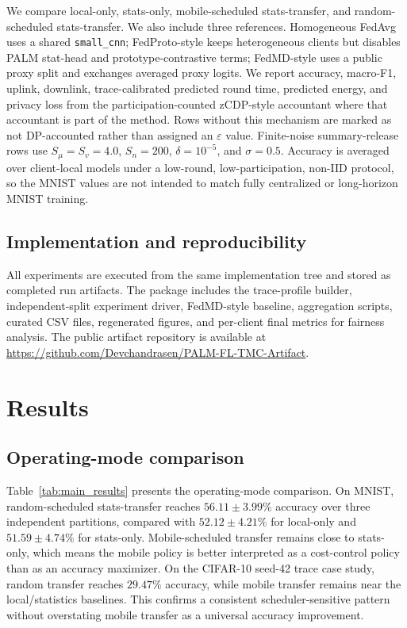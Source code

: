 \documentclass[10pt,journal]{IEEEtran}
\newcommand{\localonly}{local-only}
\newcommand{\statsonly}{stats-only}
\newcommand{\statstransfer}{stats-transfer}
\begin{document}
We compare \localonly{}, \statsonly{}, mobile-scheduled \statstransfer{}, and random-scheduled \statstransfer{}. We also include three references. Homogeneous FedAvg uses a shared \texttt{small\_cnn}; FedProto-style keeps heterogeneous clients but disables PALM stat-head and prototype-contrastive terms; FedMD-style uses a public proxy split and exchanges averaged proxy logits. We report accuracy, macro-F1, uplink, downlink, trace-calibrated predicted round time, predicted energy, and privacy loss from the participation-counted zCDP-style accountant where that accountant is part of the method. Rows without this mechanism are marked as not DP-accounted rather than assigned an $\varepsilon$ value. Finite-noise summary-release rows use $S_{\mu}=S_v=4.0$, $S_n=200$, $\delta=10^{-5}$, and $\sigma=0.5$. Accuracy is averaged over client-local models under a low-round, low-participation, non-IID protocol, so the MNIST values are not intended to match fully centralized or long-horizon MNIST training.

\subsection{Implementation and reproducibility}
All experiments are executed from the same implementation tree and stored as completed run artifacts. The package includes the trace-profile builder, independent-split experiment driver, FedMD-style baseline, aggregation scripts, curated CSV files, regenerated figures, and per-client final metrics for fairness analysis. The public artifact repository is available at \url{https://github.com/Devchandrasen/PALM-FL-TMC-Artifact}.

\section{Results}
\subsection{Operating-mode comparison}
Table~\ref{tab:main_results} presents the operating-mode comparison. On MNIST, random-scheduled \statstransfer{} reaches $56.11\pm3.99\%$ accuracy over three independent partitions, compared with $52.12\pm4.21\%$ for \localonly{} and $51.59\pm4.74\%$ for \statsonly{}. Mobile-scheduled transfer remains close to \statsonly{}, which means the mobile policy is better interpreted as a cost-control policy than as an accuracy maximizer. On the CIFAR-10 seed-42 trace case study, random transfer reaches $29.47\%$ accuracy, while mobile transfer remains near the local/statistics baselines. This confirms a consistent scheduler-sensitive pattern without overstating mobile transfer as a universal accuracy improvement.
\end{document}
